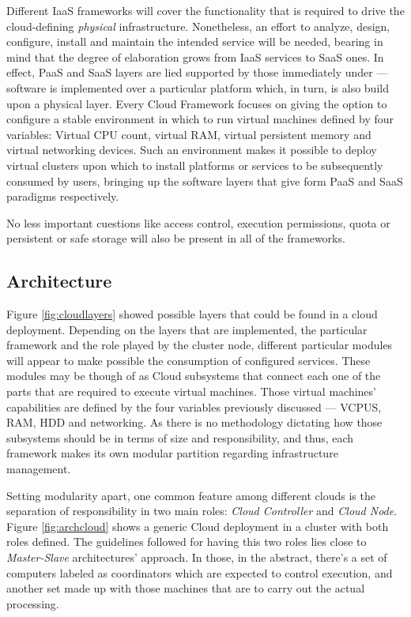 Different IaaS frameworks will cover the functionality that is required to drive the cloud-defining \emph{physical} infrastructure. Nonetheless, an effort to analyze, design, configure, install and maintain the intended service will be needed, bearing in mind that the degree of elaboration grows from IaaS services to SaaS ones. In effect, PaaS and SaaS layers are lied supported by those immediately under --- software is implemented over a particular platform which, in turn, is also build upon a physical layer. Every Cloud Framework focuses on giving the option to configure a stable environment in which to run virtual machines defined by four variables: Virtual CPU count, virtual RAM, virtual persistent memory and virtual networking devices. Such an environment makes it possible to deploy virtual clusters upon which to install platforms or services to be subsequently consumed by users, bringing up the software layers that give form PaaS and SaaS paradigms respectively.

No less important cuestions like access control, execution permissions, quota or persistent or safe storage will also be present in all of the frameworks.


\subsection{Architecture}\label{subsec:arquitecturacloud}

\noindent Figure \ref{fig:cloudlayers} showed possible layers that could be found in a cloud deployment. Depending on the layers that are implemented, the particular framework and the role played by the cluster node, different particular modules will appear to make possible the consumption of configured services. These modules may be though of as Cloud subsystems that connect each one of the parts that are required to execute virtual machines. Those virtual machines' capabilities are defined by the four variables previously discussed --- VCPUS, RAM, HDD and networking. As there is no methodology dictating how those subsystems should be in terms of size and responsibility, and thus, each framework makes its own modular partition regarding infrastructure management.

Setting modularity apart, one common feature among different clouds is the separation of responsibility in two main roles: \emph{Cloud Controller} and \emph{Cloud Node}. Figure \ref{fig:archcloud} shows a generic Cloud deployment in a cluster with both roles defined. The guidelines followed for having this two roles lies close to \emph{Master-Slave} architectures' approach. In those, in the abstract, there's a set of computers labeled as coordinators which are expected to control execution, and another set made up with those machines that are to carry out the actual processing.


